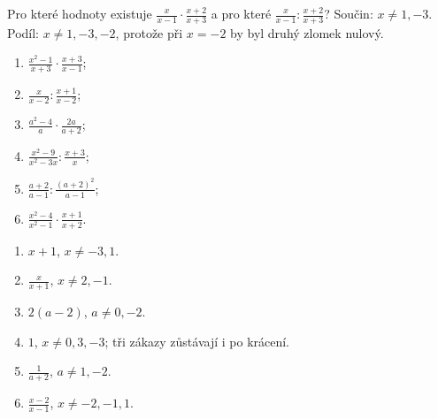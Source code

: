 \documentclass[11pt,a4paper]{article}
\begin{document}
\begin{zadaniReseniBox}[breakable=false,title={Rozšíření 1}]
Pro které hodnoty existuje $\frac{x}{x-1}\cdot\frac{x+2}{x+3}$ a pro které $\frac{x}{x-1}:\frac{x+2}{x+3}$?
\tcblower
Součin: $x\ne1,-3$. Podíl: $x\ne1,-3,-2$, protože při $x=-2$ by byl druhý zlomek nulový.
\end{zadaniReseniBox}
\begin{zadaniReseniBox}[breakable=false,title={Domácí úkol}]
\begin{enumerate}[label=\alph*)]
\item $\frac{x^2-1}{x+3}\cdot\frac{x+3}{x-1}$;
\item $\frac{x}{x-2}:\frac{x+1}{x-2}$;
\item $\frac{a^2-4}{a}\cdot\frac{2a}{a+2}$;
\item $\frac{x^2-9}{x^2-3x}:\frac{x+3}{x}$;
\item $\frac{a+2}{a-1}:\frac{(a+2)^2}{a-1}$;
\item $\frac{x^2-4}{x^2-1}\cdot\frac{x+1}{x+2}$.
\end{enumerate}
\tcblower
\begin{enumerate}[label=\alph*)]
\item $x+1$, $x\ne-3,1$.
\item $\frac{x}{x+1}$, $x\ne2,-1$.
\item $2(a-2)$, $a\ne0,-2$.
\item $1$, $x\ne0,3,-3$; tři zákazy zůstávají i po krácení.
\item $\frac1{a+2}$, $a\ne1,-2$.
\item $\frac{x-2}{x-1}$, $x\ne-2,-1,1$.
\end{enumerate}
\end{zadaniReseniBox}
\end{document}
